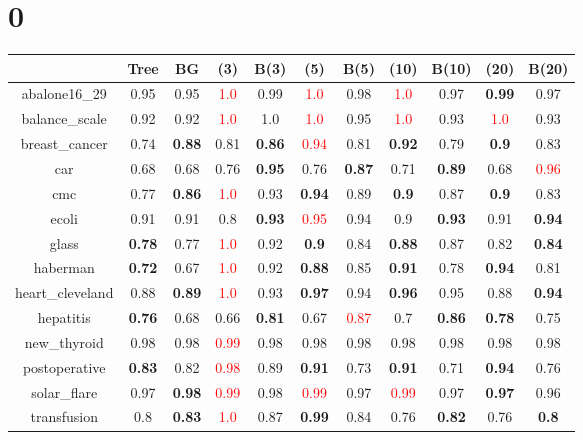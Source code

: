 \documentclass{article}%
\begin{document}
%
\normalsize%
\section*{0}%
\begin{tabular}{c|cccccccccc}%
\hline%
&Tree&BG&(3)&B(3)&(5)&B(5)&(10)&B(10)&(20)&B(20)\\%
\hline%
abalone16\_29&0.95&0.95&\textcolor{red}{ 
1.0
}&0.99&\textcolor{red}{ 
1.0
}&0.98&\textcolor{red}{ 
1.0
}&0.97&\textbf{0.99}&0.97\\%
\hline%
balance\_scale&0.92&0.92&\textcolor{red}{ 
1.0
}&1.0&\textcolor{red}{ 
1.0
}&0.95&\textcolor{red}{ 
1.0
}&0.93&\textcolor{red}{ 
1.0
}&0.93\\%
\hline%
breast\_cancer&0.74&\textbf{0.88}&0.81&\textbf{0.86}&\textcolor{red}{ 
0.94
}&0.81&\textbf{0.92}&0.79&\textbf{0.9}&0.83\\%
\hline%
car&0.68&0.68&0.76&\textbf{0.95}&0.76&\textbf{0.87}&0.71&\textbf{0.89}&0.68&\textcolor{red}{ 
0.96
}\\%
\hline%
cmc&0.77&\textbf{0.86}&\textcolor{red}{ 
1.0
}&0.93&\textbf{0.94}&0.89&\textbf{0.9}&0.87&\textbf{0.9}&0.83\\%
\hline%
ecoli&0.91&0.91&0.8&\textbf{0.93}&\textcolor{red}{ 
0.95
}&0.94&0.9&\textbf{0.93}&0.91&\textbf{0.94}\\%
\hline%
glass&\textbf{0.78}&0.77&\textcolor{red}{ 
1.0
}&0.92&\textbf{0.9}&0.84&\textbf{0.88}&0.87&0.82&\textbf{0.84}\\%
\hline%
haberman&\textbf{0.72}&0.67&\textcolor{red}{ 
1.0
}&0.92&\textbf{0.88}&0.85&\textbf{0.91}&0.78&\textbf{0.94}&0.81\\%
\hline%
heart\_cleveland&0.88&\textbf{0.89}&\textcolor{red}{ 
1.0
}&0.93&\textbf{0.97}&0.94&\textbf{0.96}&0.95&0.88&\textbf{0.94}\\%
\hline%
hepatitis&\textbf{0.76}&0.68&0.66&\textbf{0.81}&0.67&\textcolor{red}{ 
0.87
}&0.7&\textbf{0.86}&\textbf{0.78}&0.75\\%
\hline%
new\_thyroid&0.98&0.98&\textcolor{red}{ 
0.99
}&0.98&0.98&0.98&0.98&0.98&0.98&0.98\\%
\hline%
postoperative&\textbf{0.83}&0.82&\textcolor{red}{ 
0.98
}&0.89&\textbf{0.91}&0.73&\textbf{0.91}&0.71&\textbf{0.94}&0.76\\%
\hline%
solar\_flare&0.97&\textbf{0.98}&\textcolor{red}{ 
0.99
}&0.98&\textcolor{red}{ 
0.99
}&0.97&\textcolor{red}{ 
0.99
}&0.97&\textbf{0.97}&0.96\\%
\hline%
transfusion&0.8&\textbf{0.83}&\textcolor{red}{ 
1.0
}&0.87&\textbf{0.99}&0.84&0.76&\textbf{0.82}&0.76&\textbf{0.8}\\%

\end{tabular}
\end{document}
